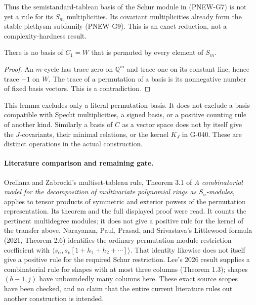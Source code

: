 Thus the semistandard-tableau basis of the Schur module in
(PNEW-G7) is not yet a rule for its $S_m$ multiplicities.
Its covariant multiplicities already form the stable plethysm
subfamily (PNEW-G9).  This is an exact reduction, not a
complexity-hardness result.

\begin{lemma}[A permutation-basis shortcut already fails at $b=2$]
There is no basis of $C_1=W$ that is permuted by every element
of $S_m$.
\end{lemma}
\begin{proof}
An $m$-cycle has trace zero on $\mathbb Q^m$ and trace one on
its constant line, hence trace $-1$ on $W$.
The trace of a permutation of a basis is its nonnegative
number of fixed basis vectors.  This is a contradiction.
\end{proof}

This lemma excludes only a literal permutation basis.  It does
not exclude a basis compatible with Specht multiplicities,
a signed basis, or a positive counting rule of another kind.
Similarly a basis of $C$ as a vector space does not by itself
give the $J$-covariants, their minimal relations, or the kernel
$K_J$ in G-040.  These are distinct operations in the actual
construction.

\paragraph{Literature comparison and remaining gate.}
Orellana and Zabrocki's multiset-tableau rule, Theorem 3.1 of
\emph{A combinatorial model for the decomposition of multivariate
polynomial rings as $S_n$-modules}, applies to tensor products
of symmetric and exterior powers of the permutation
representation.  Its theorem and the full displayed proof were
read.  It counts the pertinent multidegree modules; it does not
give a positive rule for the kernel of the transfer above.
Narayanan, Paul, Prasad, and Srivastava's Littlewood formula
(2021, Theorem 2.6) identifies the ordinary permutation-module
restriction coefficient with
$\langle s_\alpha,s_\nu[1+h_1+h_2+\cdots]\rangle$.
That identity likewise does not itself give a positive rule for
the required Schur restriction.  Lee's 2026 result supplies a
combinatorial rule for shapes with at most three columns
(Theorem 1.3); shapes $(b-1,j)$ have unboundedly many columns
here.  These exact source scopes have been checked, and no
claim that the entire current literature rules out another
construction is intended.

